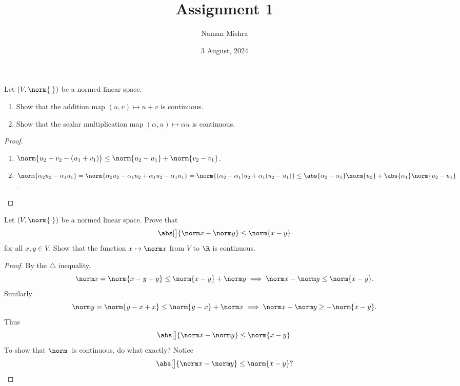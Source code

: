 \documentclass[12pt]{article}
\title{Assignment 1}
\author{Naman Mishra}
\date{3 August, 2024}
\begin{document}
\maketitle

\begin{problem} \label{prb:add-scale-cont}
    Let $(V, \norm{\cdot})$ be a normed linear space.
    \begin{enumerate}
        \item Show that the addition map $(u, v) \mapsto u + v$
            is continuous.
        \item Show that the scalar multiplication map
            $(\alpha, u) \mapsto \alpha u$ is continuous.
    \end{enumerate}
\end{problem}
\begin{proof} \leavevmode
    \begin{enumerate}
        \item $\norm{u_2 + v_2 - (u_1 + v_1)}
            \le \norm{u_2 - u_1} + \norm{v_2 - v_1}$.
        \item $\norm{\alpha_2 u_2 - \alpha_1 u_1}
            = \norm{\alpha_2 u_2 - \alpha_1 u_2 + \alpha_1 u_2 - \alpha_1 u_1}
            = \norm{(\alpha_2 - \alpha_1) u_2 + \alpha_1(u_2 - u_1)}
            \le \abs{\alpha_2 - \alpha_1} \norm{u_2}
                + \abs{\alpha_1} \norm{u_2 - u_1}$. \qedhere
    \end{enumerate}
\end{proof}

\begin{problem}
    Let $(V, \norm{\cdot})$ be a normed linear space.
    Prove that \[
        \abs[\big]{\norm x - \norm y} \le \norm{x - y}
    \] for all $x, y \in V$.
    Show that the function $x \mapsto \norm x$ from $V$ to $\R$
    is continuous.
\end{problem}
\begin{proof}
    By the $\triangle$ inequality, \[
        \norm x = \norm{x - y + y} \le \norm{x - y} + \norm y
        \implies \norm x - \norm y \le \norm{x - y}.
    \] Similarly \[
        \norm y = \norm{y - x + x} \le \norm{y - x} + \norm x
        \implies \norm x - \norm y \ge -\norm{x - y}.
    \]
    Thus \[
        \abs[\big]{\norm x - \norm y} \le \norm{x - y}.
    \]
    To show that $\norm\cdot$ is continuous, do what exactly?
    Notice \[
        \abs[\big]{\norm x - \norm y} \le \norm{x - y}? \qedhere
    \]
\end{proof}
\end{document}
